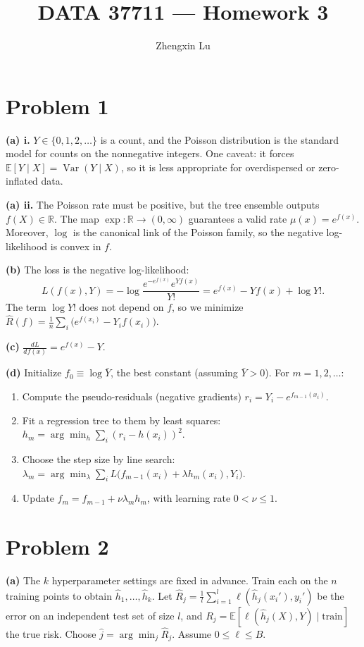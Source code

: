 \documentclass[11pt]{article}
\title{DATA 37711 --- Homework 3}
\author{Zhengxin Lu}
\date{}
\begin{document}
\maketitle

\section*{Problem 1}
\textbf{(a) i.} $Y\in\{0,1,2,\dots\}$ is a count, and the Poisson distribution is the standard model for counts on the nonnegative integers. One caveat: it forces $\mathbb E[Y\mid X]=\operatorname{Var}(Y\mid X)$, so it is less appropriate for overdispersed or zero-inflated data.

\textbf{(a) ii.} The Poisson rate must be positive, but the tree ensemble outputs $f(X)\in\mathbb R$. The map $\exp:\mathbb R\to(0,\infty)$ guarantees a valid rate $\mu(x)=e^{f(x)}$. Moreover, $\log$ is the canonical link of the Poisson family, so the negative log-likelihood is convex in $f$.

\textbf{(b)} The loss is the negative log-likelihood:
\[
L(f(x),Y)=-\log\frac{e^{-e^{f(x)}}e^{Yf(x)}}{Y!}=e^{f(x)}-Yf(x)+\log Y!.
\]
The term $\log Y!$ does not depend on $f$, so we minimize $\hat R(f)=\frac1n\sum_{i}\big(e^{f(x_i)}-Y_if(x_i)\big)$.

\textbf{(c)} $\displaystyle \frac{dL}{df(x)}=e^{f(x)}-Y$.

\textbf{(d)} Initialize $f_0\equiv\log\bar Y$, the best constant (assuming $\bar Y>0$). For $m=1,2,\dots$:
\begin{enumerate}[nosep]
\item Compute the pseudo-residuals (negative gradients) $r_i=Y_i-e^{f_{m-1}(x_i)}$.
\item Fit a regression tree to them by least squares: $h_m=\arg\min_h\sum_i(r_i-h(x_i))^2$.
\item Choose the step size by line search: $\lambda_m=\arg\min_\lambda\sum_iL\big(f_{m-1}(x_i)+\lambda h_m(x_i),Y_i\big)$.
\item Update $f_m=f_{m-1}+\nu\lambda_mh_m$, with learning rate $0<\nu\le1$.
\end{enumerate}

\section*{Problem 2}
\textbf{(a)} The $k$ hyperparameter settings are fixed in advance. Train each on the $n$ training points to obtain $\hat h_1,\dots,\hat h_k$. Let $\hat R_j=\frac1l\sum_{i=1}^l\ell(\hat h_j(x_i'),y_i')$ be the error on an independent test set of size $l$, and $R_j=\mathbb E[\ell(\hat h_j(X),Y)\mid\text{train}]$ the true risk. Choose $\hat j=\arg\min_j\hat R_j$. Assume $0\le\ell\le B$.
\end{document}
